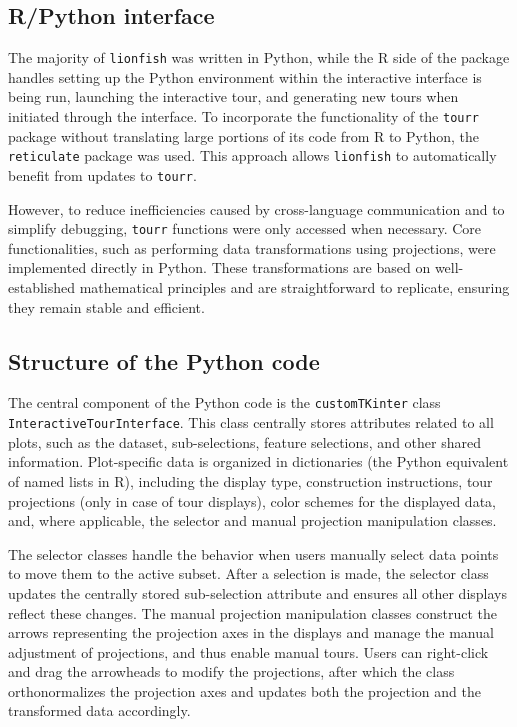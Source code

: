 \documentclass[article]{ajs}
\begin{document}
\subsection{R/Python interface}

The majority of \texttt{lionfish} was written in Python, while the R side of the package handles setting up the Python environment within the interactive interface is being run, launching the interactive tour, and generating new tours when initiated through the interface. To incorporate the functionality of the \texttt{tourr} package without translating large portions of its code from R to Python, the \texttt{reticulate} package was used. This approach allows \texttt{lionfish} to automatically benefit from updates to \texttt{tourr}.

However, to reduce inefficiencies caused by cross-language communication and to simplify debugging, \texttt{tourr} functions were only accessed when necessary. Core functionalities, such as performing data transformations using projections, were implemented directly in Python. These transformations are based on well-established mathematical principles and are straightforward to replicate, ensuring they remain stable and efficient.

\subsection{Structure of the Python code}

The central component of the Python code is the \texttt{customTKinter} class \texttt{InteractiveTourInterface}. This class centrally stores attributes related to all plots, such as the dataset, sub-selections, feature selections, and other shared information. Plot-specific data is organized in dictionaries (the Python equivalent of named lists in R), including the display type, construction instructions, tour projections (only in case of tour displays), color schemes for the displayed data, and, where applicable, the selector and manual projection manipulation classes.

The selector classes handle the behavior when users manually select data points to move them to the active subset. After a selection is made, the selector class updates the centrally stored sub-selection attribute and ensures all other displays reflect these changes. The manual projection manipulation classes construct the arrows representing the projection axes in the displays and manage the manual adjustment of projections, and thus enable manual tours. Users can right-click and drag the arrowheads to modify the projections, after which the class orthonormalizes the projection axes and updates both the projection and the transformed data accordingly.
\end{document}
